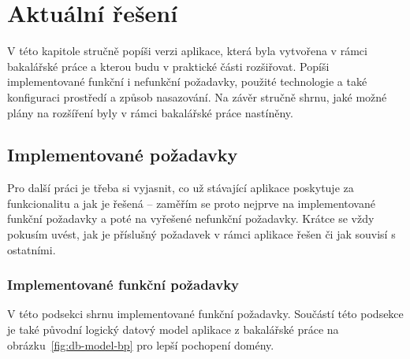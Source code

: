 \chapter{Aktuální řešení}

V této kapitole stručně popíši verzi aplikace, která byla vytvořena v rámci bakalářské práce \cite{bp} a kterou budu v praktické části rozšiřovat. Popíši implementované funkční i nefunkční požadavky, použité technologie a také konfiguraci prostředí a způsob nasazování. Na závěr stručně shrnu, jaké možné plány na rozšíření byly v rámci bakalářské práce nastíněny.

\section{Implementované požadavky}

Pro další práci je třeba si vyjasnit, co už stávající aplikace poskytuje za funkcionalitu a jak je řešená -- zaměřím se proto nejprve na implementované funkční požadavky a poté na vyřešené nefunkční požadavky. Krátce se vždy pokusím uvést, jak je příslušný požadavek v rámci aplikace řešen či jak souvisí s ostatními.

\subsection{Implementované funkční požadavky}

V této podsekci shrnu implementované funkční požadavky. Součástí této podsekce je také původní logický datový model aplikace z bakalářské práce \cite{bp} na obrázku~\ref{fig:db-model-bp} pro lepší pochopení domény.

